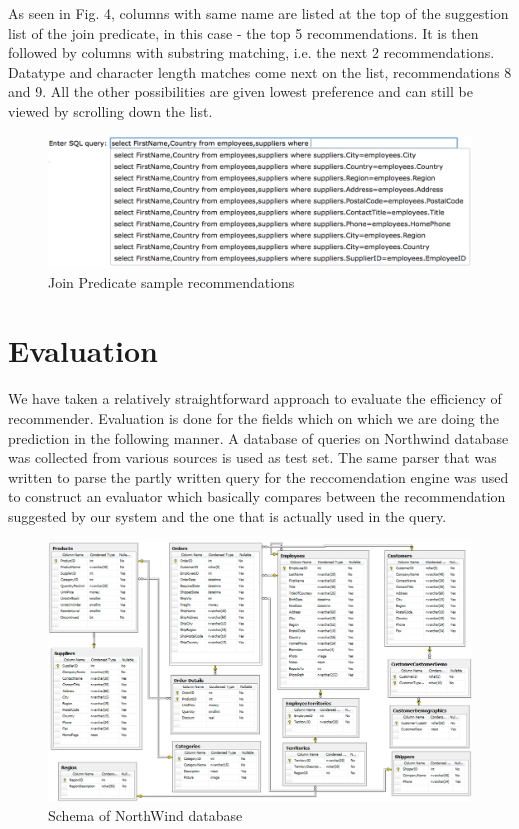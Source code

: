 \documentclass{acm_proc_article-sp}
\begin{document}
As seen in Fig. 4, columns with same name are listed at the top of the suggestion list of the join predicate, in this case - the top 5 recommendations. It is then followed by columns with substring matching, i.e. the next 2 recommendations. Datatype and character length matches come next on the list, recommendations 8 and 9. All the other possibilities are given lowest preference and can still be viewed by scrolling down the list.

\begin{figure}
\centering
\includegraphics[width=170mm]{join_predicate.png}
\caption{Join Predicate sample recommendations}
\label{overflow}
\end{figure}

\section{Evaluation}
We have taken a relatively straightforward approach to evaluate the efficiency of recommender. Evaluation is done for the fields which on which we are doing the prediction in the following manner. A database of queries on Northwind database was collected from various sources is used as test set. The same parser that was written to parse the partly written query for the reccomendation engine was used to construct an evaluator which basically compares between the recommendation suggested by our system and the one that is actually used in the query. 

\begin{figure}
\centering
\includegraphics[width=170mm]{Northwind_schema.png}
\caption{Schema of NorthWind database}
\label{overflow}
\end{figure}
\end{document}
